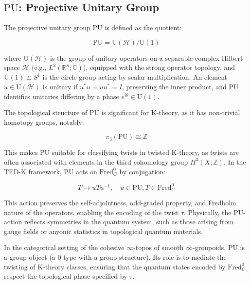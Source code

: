 \documentclass{article}
\theoremstyle{definition}
\begin{document}
\subsection{\(\mathrm{PU}\): Projective Unitary Group}
\label{subsec:pu}

The projective unitary group \(\mathrm{PU}\) is defined as the quotient:

\begin{equation}
\mathrm{PU} = \mathrm{U}(\mathscr{H}) / \mathrm{U}(1)
\end{equation}

where \(\mathrm{U}(\mathscr{H})\) is the group of unitary operators on a separable complex Hilbert space \(\mathscr{H}\) (e.g., \(L^2(\mathbb{R}^n; \mathbb{C})\)), equipped with the strong operator topology, and \(\mathrm{U}(1) \cong S^1\) is the circle group acting by scalar multiplication. An element \(u \in \mathrm{U}(\mathscr{H})\) is unitary if \(u^* u = u u^* = I\), preserving the inner product, and \(\mathrm{PU}\) identifies unitaries differing by a phase \(e^{i\theta} \in \mathrm{U}(1)\).

The topological structure of \(\mathrm{PU}\) is significant for K-theory, as it has non-trivial homotopy groups, notably:

\begin{equation}
\pi_3(\mathrm{PU}) \cong \mathbb{Z}
\end{equation}

This makes \(\mathrm{PU}\) suitable for classifying twists in twisted K-theory, as twists are often associated with elements in the third cohomology group \(H^3(X; \mathbb{Z})\). In the TED-K framework, \(\mathrm{PU}\) acts on \(\text{Fred}_C^0\) by conjugation:

\begin{equation}
T \mapsto u T u^{-1}, \quad u \in \mathrm{PU}, T \in \text{Fred}_C^0
\end{equation}

This action preserves the self-adjointness, odd-graded property, and Fredholm nature of the operators, enabling the encoding of the twist \(\tau\). Physically, the \(\mathrm{PU}\)-action reflects symmetries in the quantum system, such as those arising from gauge fields or anyonic statistics in topological quantum materials.

In the categorical setting of the cohesive \(\infty\)-topos of smooth \(\infty\)-groupoids, \(\mathrm{PU}\) is a group object (a 0-type with a group structure). Its role is to mediate the twisting of K-theory classes, ensuring that the quantum states encoded by \(\text{Fred}_C^0\) respect the topological phase specified by \(\tau\).
\end{document}
